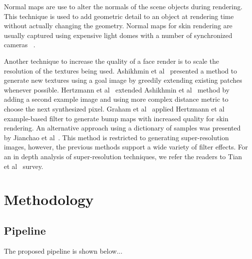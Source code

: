 \documentclass[11pt]{report}
\begin{document}
Normal maps are use to alter the normals of the scene objects during rendering.
This technique is used to add geometric detail to an object at rendering time without actually changing the geometry.
Normal maps for skin rendering are usually captured using expensive light domes with a number of synchronized cameras ~\cite{Graham2013, Weyrich2006}. 

Another technique to increase the quality of a face render is to scale the resolution of the textures being used.
Ashikhmin et al~\cite{Ashikhmin2001} presented a method to generate new textures using a goal image by greedily extending existing patches whenever possible.
Hertzmann et al~\cite{Hertzmann2001} extended Ashikhmin et al~\cite{Ashikhmin2001} method by adding a second example image and using more complex distance metric to choose the next synthesized pixel.
Graham et al~\cite{Graham2013} applied Hertzmann et al~\cite{Hertzmann2001} example-based filter to generate bump maps with increased quality for skin rendering.
An alternative approach using a dictionary of samples was presented by Jianchao et al~\cite{Jianchao2010}.
This method is restricted to generating super-resolution images, however, the previous methods support a wide variety of filter effects.
For an in depth analysis of super-resolution techniques, we refer the readers to Tian et al~\cite{Tian2011} survey.




\chapter{Methodology}
\label{sec:methods}

\section{Pipeline}

The proposed pipeline is shown below...
\end{document}
